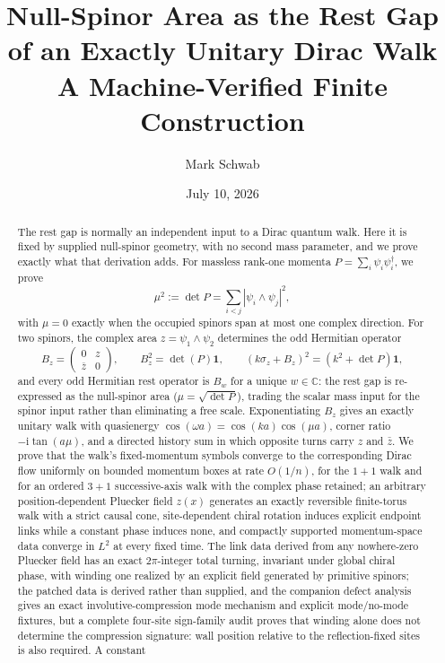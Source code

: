 \documentclass[11pt]{article}
\title{Null-Spinor Area as the Rest Gap of an Exactly Unitary Dirac Walk\\
\large A Machine-Verified Finite Construction}
\author{Mark Schwab}
\date{July 10, 2026}
\newcommand{\ii}{\mathrm{i}}
\newcommand{\C}{\mathbb{C}}
\newcommand{\id}{\mathbf{1}}
\begin{document}
\maketitle

\begin{abstract}
The rest gap is normally an independent input to a Dirac quantum walk.  Here
it is fixed by supplied null-spinor geometry, with no second mass parameter,
and we prove exactly what that derivation adds.  For
massless rank-one momenta $P=\sum_i\psi_i\psi_i^\dagger$, we prove
\[
  \mu^2:=\det P
  =\sum_{i<j}|\psi_i\wedge\psi_j|^2,
\]
with $\mu=0$ exactly when the occupied spinors span at most one complex
direction.  For two
spinors, the complex area $z=\psi_1\wedge\psi_2$ determines the odd Hermitian
operator
\[
  B_z=\begin{pmatrix}0&z\\ \overline z&0\end{pmatrix},
  \qquad B_z^2=\det(P)\id,
  \qquad (k\sigma_z+B_z)^2=(k^2+\det P)\id,
\]
and every odd Hermitian rest operator is $B_w$ for a unique $w\in\C$: the rest
gap is re-expressed as the null-spinor area ($\mu=\sqrt{\det P}$), trading
the scalar mass input for the spinor input rather than eliminating a free
scale.
Exponentiating $B_z$ gives an exactly unitary walk with quasienergy
$\cos(\omega a)=\cos(ka)\cos(\mu a)$, corner ratio $-\ii\tan(a\mu)$, and a
directed history sum in which opposite turns carry $z$ and $\bar z$.  We prove
that the walk's fixed-momentum symbols converge to the corresponding Dirac
flow uniformly on bounded momentum boxes at rate $O(1/n)$, for the $1+1$
walk and for an ordered $3+1$ successive-axis walk with the complex phase
retained; an arbitrary position-dependent Pluecker field $z(x)$ generates an
exactly reversible finite-torus walk with a strict causal cone, site-dependent
chiral rotation induces explicit endpoint links while a constant phase induces
none, and compactly supported momentum-space data converge in $L^2$ at every
fixed time.  The link data derived from any nowhere-zero Pluecker field has
an exact $2\pi$-integer total turning, invariant under global chiral phase,
with winding one realized by an explicit field generated by primitive
spinors; the patched data is derived rather than supplied, and the
companion defect analysis gives an exact involutive-compression mode mechanism
and explicit mode/no-mode fixtures, but a complete four-site sign-family audit
proves that winding alone does not determine the compression signature: wall
position relative to the reflection-fixed sites is also required.  A constant

\end{abstract}
\end{document}
